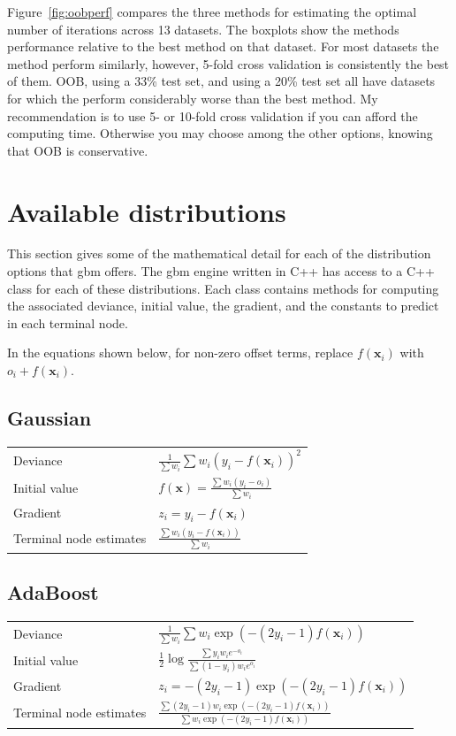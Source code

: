 \documentclass{article}
\begin{document}
Figure~\ref{fig:oobperf} compares the three methods for estimating the optimal number of iterations across 13 datasets. The boxplots show the methods performance relative to the best method on that dataset. For most datasets the method perform similarly, however, 5-fold cross validation is consistently the best of them. OOB, using a 33\% test set, and using a 20\% test set all have datasets for which the perform considerably worse than the best method. My recommendation is to use 5- or 10-fold cross validation if you can afford the computing time. Otherwise you may choose among the other options, knowing that OOB is conservative.

\section{Available distributions}

This section gives some of the mathematical detail for each of the distribution options that gbm offers. The gbm engine written in C++ has access to a C++ class for each of these distributions. Each class contains methods for computing the associated deviance, initial value, the gradient, and the constants to predict in each terminal node.

In the equations shown below, for non-zero offset terms, replace $f(\mathbf{x}_i)$ with $o_i + f(\mathbf{x}_i)$.

\subsection{Gaussian}

\begin{tabular}{ll} 
Deviance & $\displaystyle \frac{1}{\sum w_i} \sum w_i(y_i-f(\mathbf{x}_i))^2$ \\ 
Initial value & $\displaystyle f(\mathbf{x})=\frac{\sum w_i(y_i-o_i)}{\sum w_i}$ \\ 
Gradient & $z_i=y_i - f(\mathbf{x}_i)$ \\ 
Terminal node estimates & $\displaystyle \frac{\sum w_i(y_i-f(\mathbf{x}_i))}{\sum w_i}$ 
\end{tabular}

\subsection{AdaBoost}

\begin{tabular}{ll} Deviance & $\displaystyle \frac{1}{\sum w_i} \sum w_i\exp(-(2y_i-1)f(\mathbf{x}_i))$ \\ Initial value & $\displaystyle \frac{1}{2}\log\frac{\sum y_iw_ie^{-o_i}}{\sum (1-y_i)w_ie^{o_i}}$ \\ Gradient & $\displaystyle z_i= -(2y_i-1)\exp(-(2y_i-1)f(\mathbf{x}_i))$ \\ Terminal node estimates & $\displaystyle \frac{\sum (2y_i-1)w_i\exp(-(2y_i-1)f(\mathbf{x}_i))}
      {\sum w_i\exp(-(2y_i-1)f(\mathbf{x}_i))}$
\end{tabular}
\end{document}
